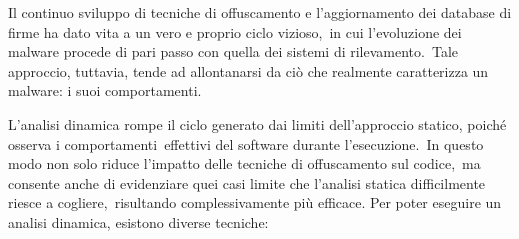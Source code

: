 Il continuo sviluppo di tecniche di offuscamento e l'aggiornamento dei database di firme ha dato vita a un vero e proprio ciclo vizioso,\
in cui l'evoluzione dei malware procede di pari passo con quella dei sistemi di rilevamento.\
Tale approccio, tuttavia, tende ad allontanarsi da ciò che realmente caratterizza un malware: i suoi comportamenti.

L'analisi dinamica rompe il ciclo generato dai limiti dell'approccio statico, poiché osserva i comportamenti\
effettivi del software durante l'esecuzione.\
In questo modo non solo riduce l'impatto delle tecniche di offuscamento sul codice,\
ma consente anche di evidenziare quei casi limite che l'analisi statica difficilmente riesce a cogliere,\
risultando complessivamente più efficace.
Per poter eseguire un analisi dinamica, esistono diverse tecniche:

